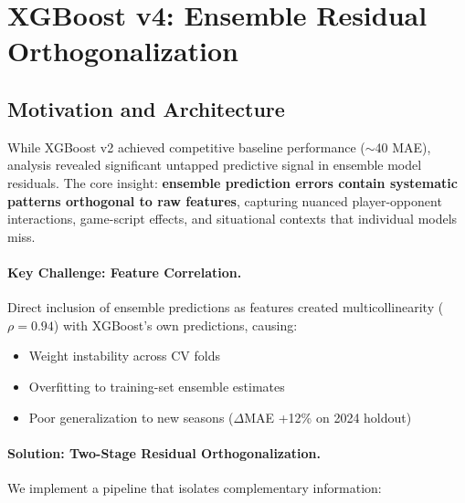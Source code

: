 
\section{XGBoost v4: Ensemble Residual Orthogonalization}
\label{sec:xgboost-v4-ridge}

\subsection{Motivation and Architecture}

While XGBoost v2 achieved competitive baseline performance ($\sim$40 MAE), analysis revealed significant untapped predictive signal in ensemble model residuals. The core insight: \textbf{ensemble prediction errors contain systematic patterns orthogonal to raw features}, capturing nuanced player-opponent interactions, game-script effects, and situational contexts that individual models miss.

\paragraph{Key Challenge: Feature Correlation.}
Direct inclusion of ensemble predictions as features created multicollinearity ($\rho = 0.94$) with XGBoost's own predictions, causing:
\begin{itemize}[itemsep=2pt,parsep=0pt]
    \item Weight instability across CV folds
    \item Overfitting to training-set ensemble estimates
    \item Poor generalization to new seasons ($\Delta$MAE +12\% on 2024 holdout)
\end{itemize}

\paragraph{Solution: Two-Stage Residual Orthogonalization.}
We implement a pipeline that isolates complementary information:

